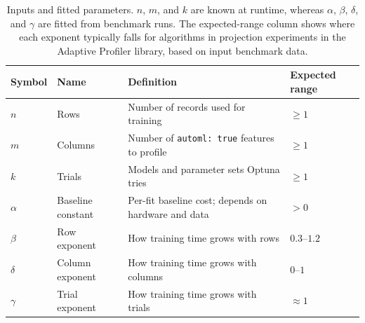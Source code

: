 \documentclass[12pt]{article}
\begin{document}
\begin{table}[H]
\begin{center}
\begin{tabularx}{\linewidth}{@{}llXl@{}}
\toprule
Symbol & Name & Definition & Expected range \\
\midrule
$n$      & Rows              & Number of records used for training & $\ge 1$ \\
$m$      & Columns           & Number of \texttt{automl: true} features to profile & $\ge 1$ \\
$k$      & Trials            & Models and parameter sets Optuna tries & $\ge 1$ \\
\midrule
$\alpha$ & Baseline constant & Per-fit baseline cost; depends on hardware and data & $> 0$ \\
$\beta$  & Row exponent      & How training time grows with rows & $0.3$--$1.2$ \\
$\delta$ & Column exponent   & How training time grows with columns & $0$--$1$ \\
$\gamma$ & Trial exponent    & How training time grows with trials & $\approx 1$ \\
\bottomrule
\end{tabularx}
\end{center}
\caption{Inputs and fitted parameters. $n$, $m$, and $k$ are known at runtime, whereas $\alpha$, $\beta$, $\delta$, and $\gamma$ are fitted from benchmark runs. The expected-range column shows where each exponent typically falls for algorithms in projection experiments in the Adaptive Profiler library, based on input benchmark data.}
\label{tab:scaling_params}
\end{table}
\end{document}
